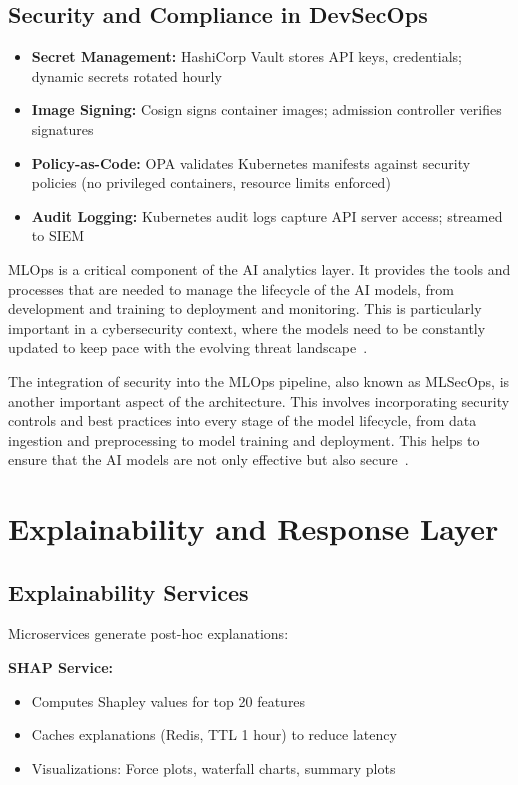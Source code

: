 \subsection{Security and Compliance in DevSecOps}
\begin{itemize}
    \item \textbf{Secret Management:} HashiCorp Vault stores API keys, credentials; dynamic secrets rotated hourly
    \item \textbf{Image Signing:} Cosign signs container images; admission controller verifies signatures
    \item \textbf{Policy-as-Code:} OPA validates Kubernetes manifests against security policies (no privileged containers, resource limits enforced)
    \item \textbf{Audit Logging:} Kubernetes audit logs capture API server access; streamed to SIEM
\end{itemize}

MLOps is a critical component of the AI analytics layer. It provides the tools and processes that are needed to manage the lifecycle of the AI models, from development and training to deployment and monitoring. This is particularly important in a cybersecurity context, where the models need to be constantly updated to keep pace with the evolving threat landscape~\cite{ibm2024mlops}.

The integration of security into the MLOps pipeline, also known as MLSecOps, is another important aspect of the architecture. This involves incorporating security controls and best practices into every stage of the model lifecycle, from data ingestion and preprocessing to model training and deployment. This helps to ensure that the AI models are not only effective but also secure~\cite{mlsecops2024}.

\section{Explainability and Response Layer}\label{sec:arch-xai}
\subsection{Explainability Services}
Microservices generate post-hoc explanations:

\textbf{SHAP Service:}
\begin{itemize}
    \item Computes Shapley values for top 20 features
    \item Caches explanations (Redis, TTL 1 hour) to reduce latency
    \item Visualizations: Force plots, waterfall charts, summary plots
\end{itemize}

